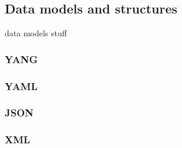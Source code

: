 \subsection{Data models and structures}
data models stuff

\subsubsection{YANG}
\subsubsection{YAML}
\subsubsection{JSON}
\subsubsection{XML}
